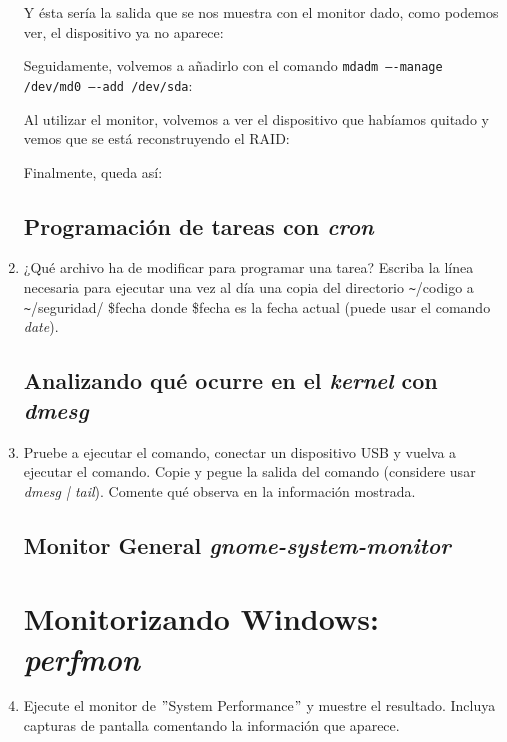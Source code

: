 \documentclass[paper=a4, fontsize=11pt]{scrartcl} %
\numberwithin{equation}{section} %
\numberwithin{figure}{section} %
\numberwithin{table}{section} %
\begin{document}
\begin{enumerate}
		
		Y ésta sería la salida que se nos muestra con el monitor dado, como podemos ver, el dispositivo
		ya no aparece:
		
		
		Seguidamente, volvemos a añadirlo con el comando \verb|mdadm –-manage /dev/md0 –-add /dev/sda|:
		
		
		Al utilizar el monitor, volvemos a ver el dispositivo que habíamos quitado y vemos que se está
		reconstruyendo el RAID:
		
		
		Finalmente, queda así:
		
		
	\subsection{Programación de tareas con \textit{cron}}
		\item ¿Qué archivo ha de modificar para programar una tarea? Escriba la línea necesaria para
		ejecutar una vez al día una copia del directorio \verb|~|/codigo a \verb|~|/seguridad/
		\$fecha donde \$fecha es la fecha actual (puede usar el comando \textit{date}).
		
	\subsection{Analizando qué ocurre en el \textit{kernel} con \textit{dmesg}}
		\item Pruebe a ejecutar el comando, conectar un dispositivo USB y vuelva a ejecutar el
		comando. Copie y pegue la salida del comando (considere usar \textit{dmesg | tail}). Comente
		qué observa en la información mostrada.
		
	\subsection{Monitor General \textit{gnome-system-monitor}}
	\section{Monitorizando Windows: \textit{perfmon}}
		\item Ejecute el monitor de $"$System Performance$"$ y muestre el resultado. Incluya capturas
		de pantalla comentando la información que aparece.
		

\end{enumerate}
\end{document}
